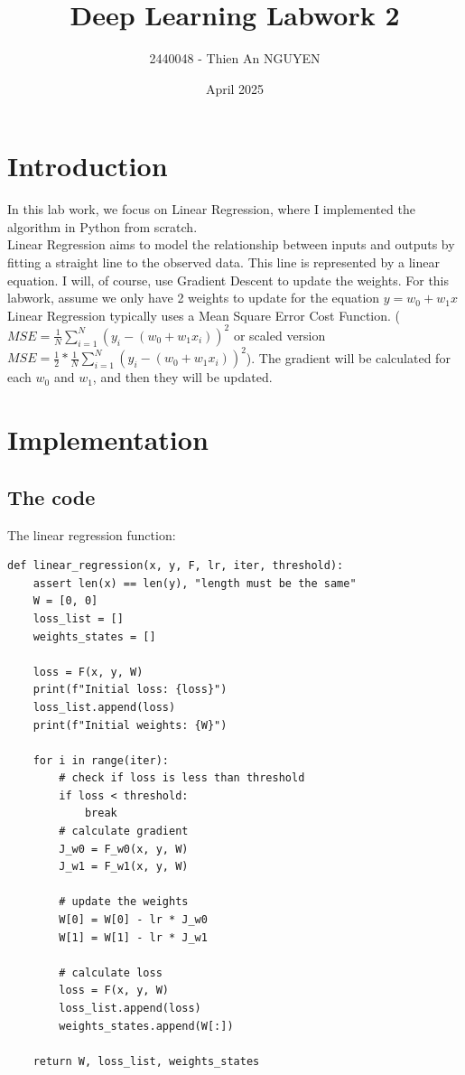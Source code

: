 \documentclass{article}
\title{Deep Learning Labwork 2}
\author{2440048 - Thien An NGUYEN}
\date{April 2025}
\begin{document}
\maketitle

\section{Introduction}
In this lab work, we focus on Linear Regression, where I implemented the algorithm in Python from scratch.\\
\noindent Linear Regression aims to model the relationship between inputs and outputs by fitting a straight line to the observed data. This line is represented by a linear equation. I will, of course, use Gradient Descent to update the weights. For this labwork, assume we only have 2 weights to update for the equation $y = w_0 + w_1x$\\
\noindent Linear Regression typically uses a Mean Square Error Cost Function. ($MSE = \frac{1}{N} \sum_{i=1}^{N} (y_i - (w_0 + w_1 x_i))^2$ or scaled version $MSE = \frac{1}{2}* \frac{1}{N} \sum_{i=1}^{N} (y_i - (w_0 + w_1 x_i))^2$). The gradient will be calculated for each $w_0$ and $w_1$, and then they will be updated.

\section{Implementation}
\subsection{The code}
The linear regression function:
\begin{verbatim}
def linear_regression(x, y, F, lr, iter, threshold):
    assert len(x) == len(y), "length must be the same"
    W = [0, 0]
    loss_list = []
    weights_states = []

    loss = F(x, y, W)
    print(f"Initial loss: {loss}")
    loss_list.append(loss)
    print(f"Initial weights: {W}")

    for i in range(iter):
        # check if loss is less than threshold
        if loss < threshold:
            break
        # calculate gradient
        J_w0 = F_w0(x, y, W)
        J_w1 = F_w1(x, y, W)

        # update the weights
        W[0] = W[0] - lr * J_w0
        W[1] = W[1] - lr * J_w1

        # calculate loss
        loss = F(x, y, W)
        loss_list.append(loss)
        weights_states.append(W[:])
    
    return W, loss_list, weights_states
\end{verbatim}
\end{document}
